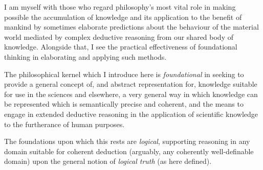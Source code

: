 I am myself with those who regard philosophy's most vital role in making possible the accumulation of knowledge and its application to the benefit of mankind by sometimes elaborate predictions about the behaviour of the material world mediated by complex deductive reasoning from our shared body of knowledge.
Alongside that, I see the practical effectiveness of foundational thinking in elaborating and applying such methods.

The philosophical kernel which I introduce here is \emph{foundational} in seeking to provide a general concept of, and abstract representation for, knowledge suitable for use in the sciences and elsewhere, a very general way in which knowledge can be represented which is semantically precise and coherent, and the means to engage in extended deductive reasoning in the application of scientific knowledge to the furtherance of human purposes.

The foundations upon which this rests are \emph{logical}, supporting reasoning in any domain suitable for coherent deduction (arguably,  any coherently well-definable domain) upon the general notion of \emph{logical truth} (as here defined).


